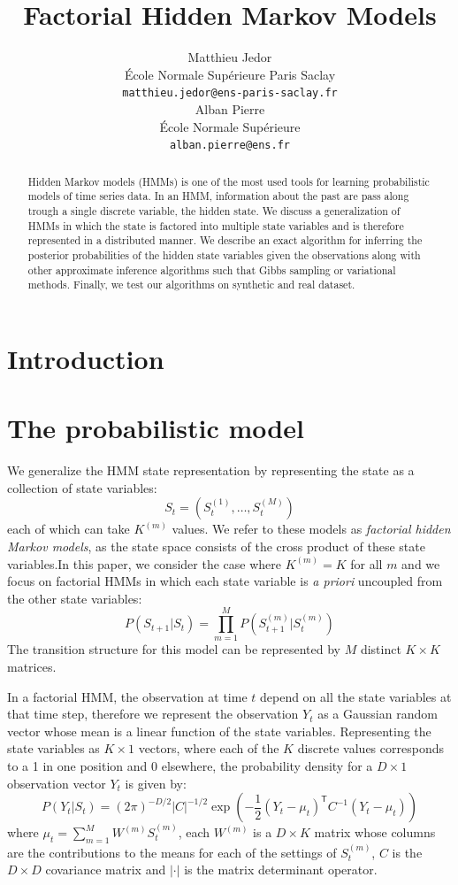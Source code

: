 \documentclass{article}
\title{Factorial Hidden Markov Models}
\author{
  Matthieu Jedor \\
  École Normale Supérieure Paris Saclay \\
  \texttt{matthieu.jedor@ens-paris-saclay.fr} \\
   \And
   Alban Pierre \\
   École Normale Supérieure \\
   \texttt{alban.pierre@ens.fr} \\
}
\begin{document}

\maketitle

\begin{abstract}
  Hidden Markov models (HMMs) is one of the most used tools for learning probabilistic models of time series data. In an HMM, information about the past are pass along trough a single discrete variable, the hidden state. We discuss a generalization of HMMs in which the state is factored into multiple state variables and is therefore represented in a distributed manner. We describe an exact algorithm for inferring the posterior probabilities of the hidden state variables given the observations along with other approximate inference algorithms such that Gibbs sampling or variational methods. Finally, we test our algorithms on synthetic and real dataset.
\end{abstract}

\section{Introduction}

\section{The probabilistic model}
We generalize the HMM state representation by representing the state as a collection of state variables:
\[ S_t = (S_t^{(1)},\dots,S_t^{(M)}) \]
each of which can take $K^{(m)}$ values. We refer to these models as \emph{factorial hidden Markov models}, as the state space consists of the cross product of these state variables.In this paper, we consider the case where $K^{(m)} = K$ for all $m$ and we focus on factorial HMMs in which each state variable is \emph{a priori} uncoupled from the other state variables:
\begin{equation} 
P(S_{t+1}|S_t) = \prod_{m=1}^M P(S_{t+1}^{(m)}|S_t^{(m)}) 
\end{equation}
The transition structure for this model can be represented by $M$ distinct $K \times K$ matrices.

In a factorial HMM, the observation at time $t$ depend on all the state variables at that time step, therefore we represent the observation $Y_t$ as a Gaussian random vector whose mean is a linear function of the state variables. Representing the state variables as $K \times 1$ vectors, where each of the $K$ discrete values corresponds to a 1 in one position and 0 elsewhere, the probability density for a $D \times 1$ observation vector $Y_t$ is given by:
\begin{equation}
P(Y_t|S_t) = (2 \pi)^{-D/2} \left| C \right|^{-1/2} \exp \left( -\frac{1}{2} (Y_t - \mu_t)^\mathsf{T} C^{-1} (Y_t - \mu_t) \right)
\end{equation}  
where $\mu_t = \sum_{m=1}^M W^{(m)} S_t^{(m)}$, each $W^{(m)}$ is a $D \times K$ matrix whose columns are the contributions to the means for each of the settings of $S_t^{(m)}$, $C$ is the $D \times D$ covariance matrix and $\left| \cdot \right|$ is the matrix determinant operator.
\end{document}
